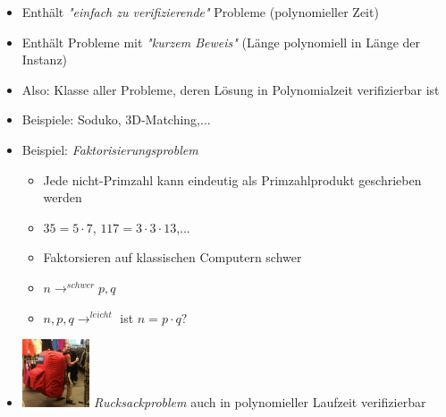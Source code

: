 \documentclass[
    ngerman,
    color=3b,
    dark_mode,
    load_common, %
    summary,
    boxarc,
]{tuda_summary}
\begin{document}
\begin{definition}[Klasse NP]\mbox{}
      \begin{itemize}
            \item Enthält \textit{\string"einfach zu verifizierende\string"} Probleme (polynomieller Zeit)
            \item Enthält Probleme mit \textit{\string"kurzem Beweis\string"} (Länge polynomiell in Länge der Instanz)
            \item Also: Klasse aller Probleme, deren Lösung in Polynomialzeit verifizierbar ist
      \end{itemize}
\end{definition}
\begin{itemize}

      \item Beispiele: Soduko, 3D-Matching,...
      \item Beispiel: \textit{Faktorisierungsproblem}
            \begin{itemize}
                  \item Jede nicht-Primzahl kann eindeutig als Primzahlprodukt geschrieben werden
                  \item $35 = 5 \cdot 7$, $117 = 3 \cdot 3 \cdot 13$,...
                  \item Faktorsieren auf klassischen Computern schwer
                  \item $n \longrightarrow^{schwer} p,q$
                  \item $n,p,q \longrightarrow^{leicht}$ ist $n = p \cdot q?$
            \end{itemize}
      \item \includegraphics[width=2cm]{pictures/rucksackproblem.png} \textit{Rucksackproblem} auch in polynomieller Laufzeit verifizierbar
\end{itemize}
\clearpage
\end{document}
